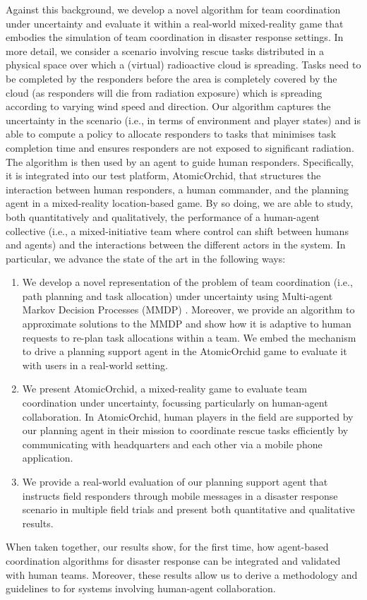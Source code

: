 Against this background, we develop a novel algorithm for team coordination under uncertainty and evaluate it within a real-world mixed-reality game that embodies the simulation of team coordination in disaster response settings. In more detail, we consider a scenario involving rescue tasks distributed in a physical space over which a (virtual) radioactive cloud is spreading. Tasks need to be completed by the responders before the area is completely covered by the cloud (as responders will die from radiation exposure) which is spreading according to varying wind speed and direction. Our algorithm captures the uncertainty in the scenario (i.e., in terms of environment and player states) and  is able to compute a policy to allocate responders to tasks that minimises task completion time and ensures responders are not exposed to significant radiation. The algorithm is then used by an agent to guide human responders. Specifically, it is integrated  into our test platform, AtomicOrchid, that structures the interaction between human responders, a human commander, and the planning agent in a mixed-reality location-based game. By so doing, we are able to study, both quantitatively and qualitatively, the performance of a human-agent collective (i.e., a mixed-initiative team where control can shift between humans and agents)  and the interactions between the different actors in the system. In particular, we  advance the state of the art in the following ways:
\begin{enumerate}
\item We develop a novel representation of the problem of  team coordination  (i.e., path planning and task allocation) under uncertainty using Multi-agent Markov Decision Processes (MMDP)  \cite{boutilier1996planning}. Moreover, we provide an algorithm to approximate solutions to the MMDP and show how it is adaptive to human requests to re-plan task allocations within a team.  We embed the mechanism to drive a planning support agent in the AtomicOrchid game to evaluate it with users in a real-world setting. 
\item We present AtomicOrchid, a mixed-reality game to evaluate team coordination under uncertainty, focussing particularly on human-agent collaboration. In AtomicOrchid, human players in the field are supported by our planning agent in their mission to coordinate rescue tasks efficiently by communicating with headquarters and each other via a mobile phone application.
\item We provide a real-world evaluation of our planning support agent that instructs field responders through mobile messages in a disaster response scenario in multiple field trials and present both quantitative and qualitative results. 
\end{enumerate}
When taken together, our results show, for the first time, how agent-based coordination algorithms for disaster response can be integrated and validated with human teams. Moreover, these results allow us to derive a methodology and guidelines to for systems involving  human-agent collaboration. 

